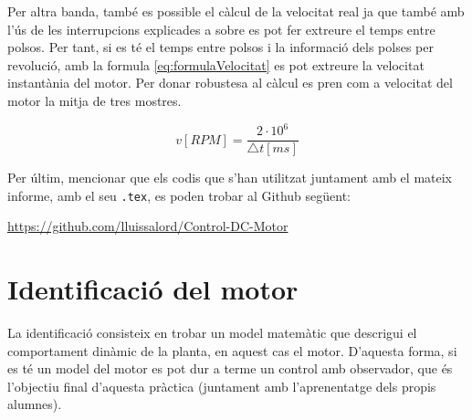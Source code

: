 \documentclass[12pt,a4paper,final,twoside,openright]{report}
\begin{document}
Per altra banda, també es possible el càlcul de la velocitat real ja que també amb l'ús de les interrupcions explicades a sobre es pot fer extreure el temps entre polsos. Per tant, si es té el temps entre polsos i la informació dels polses per revolució, amb la formula \eqref{eq:formulaVelocitat} es pot extreure la velocitat instantània del motor. Per donar robustesa al càlcul es pren com a velocitat del motor la mitja de tres mostres.

\begin{equation}\label{eq:formulaVelocitat}
v [RPM] = \frac{2\cdot 10^6}{\triangle t [ms]}
\end{equation}

Per últim, mencionar que els codis que s'han utilitzat juntament amb el mateix informe, amb el seu \texttt{.tex}, es poden trobar al Github següent:

\url{https://github.com/lluissalord/Control-DC-Motor}

\chapter{Identificació del motor}

La identificació consisteix en trobar un model matemàtic que descrigui el comportament dinàmic de la planta, en aquest cas el motor. D'aquesta forma, si es té un model del motor es pot dur a terme un control amb observador, que és l'objectiu final d'aquesta pràctica (juntament amb l'aprenentatge dels propis alumnes). 
\end{document}
